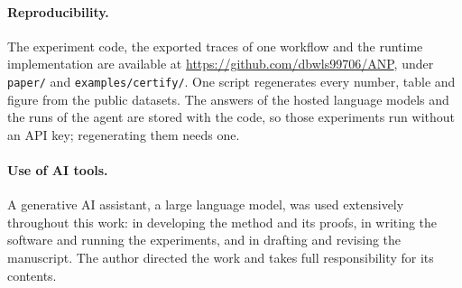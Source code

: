 \documentclass[11pt]{article}
\theoremstyle{definition}
\theoremstyle{remark}
\begin{document}
\paragraph{Reproducibility.} The experiment code, the exported traces of one workflow and the
runtime implementation are available at \url{https://github.com/dbwls99706/ANP}, under
\texttt{paper/} and \texttt{examples/certify/}. One script regenerates every number, table and
figure from the public datasets. The answers of the hosted language models and the runs of
the agent are stored with the code, so those experiments run without an API key; regenerating
them needs one.

\paragraph{Use of AI tools.} A generative AI assistant, a large language model, was used
extensively throughout this work: in developing the method and its proofs, in writing the
software and running the experiments, and in drafting and revising the manuscript. The
author directed the work and takes full responsibility for its contents.




\appendix

\end{document}
